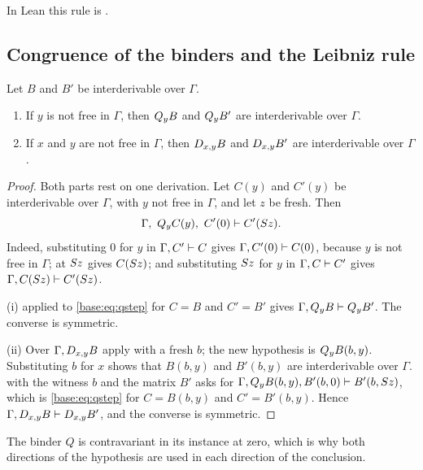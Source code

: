 In Lean this rule is .

\subsection{Congruence of the binders and the Leibniz rule}

\begin{lemma}
\label{base:lem:bindercong}
Let $B$ and $B'$ be interderivable over $\Gamma$.
\begin{enumerate}[label=\textup{(\roman*)}]
\item If $y$ is not free in $\Gamma$, then $Q_{y}B$ and $Q_{y}B'$ are
 interderivable over $\Gamma$.
\item If $x$ and $y$ are not free in $\Gamma$, then $D_{x,y}B$ and
 $D_{x,y}B'$ are interderivable over $\Gamma$.
\end{enumerate}
\end{lemma}

\begin{proof}
Both parts rest on one derivation.  Let $C(y)$ and $C'(y)$ be
interderivable over $\Gamma$, with $y$ not free in $\Gamma$, and let $z$ be
fresh.  Then
\begin{equation}
 \Gamma,\ \Q{y}C(y),\ C'(0)\proves C'(\Suc z). \label{base:eq:qstep}
\end{equation}
Indeed, substituting $0$ for $y$ in $\Gamma,C'\vdash C$ gives
$\Gamma,C'(0)\vdash C(0)$, because $y$ is not free in $\Gamma$;
 at $S z$ gives $C(S z)$; and substituting $S z$ for
$y$ in $\Gamma,C\vdash C'$ gives $\Gamma,C(S z)\vdash C'(S z)$.

(i)  applied to \eqref{base:eq:qstep} for $C=B$ and
$C'=B'$ gives $\Gamma,Q_{y}B\vdash Q_{y}B'$.  The converse is symmetric.

(ii) Over $\Gamma,D_{x,y}B$ apply  with a fresh $b$; the new
hypothesis is $Q_{y}B(b,y)$.  Substituting $b$ for $x$ shows that $B(b,y)$
and $B'(b,y)$ are interderivable over $\Gamma$.   with the
witness $b$ and the matrix $B'$ asks for
$\Gamma,Q_{y}B(b,y),B'(b,0)\vdash B'(b,S z)$, which is
\eqref{base:eq:qstep} for $C=B(b,y)$ and $C'=B'(b,y)$.  Hence
$\Gamma,D_{x,y}B\vdash D_{x,y}B'$, and the converse is symmetric.
\end{proof}

The binder $Q$ is contravariant in its instance at zero, which is why
both directions of the hypothesis are used in each direction of the
conclusion.

